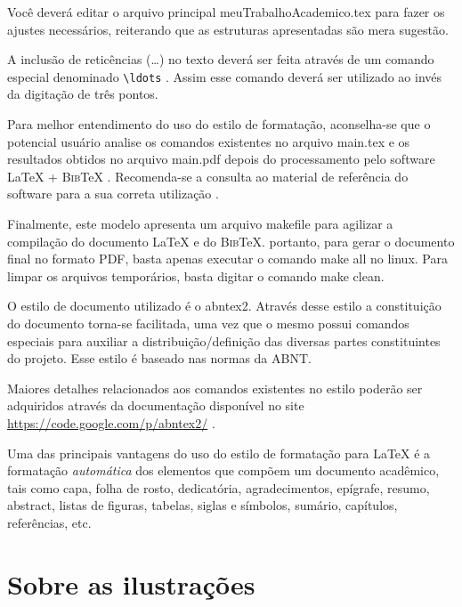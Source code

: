 \begin{apendicesenv}
Você deverá editar o arquivo principal {\ttfamily meuTrabalhoAcademico.tex} para
fazer os ajustes necessários, reiterando que as estruturas apresentadas são mera
sugestão.

A inclusão de reticências (\ldots) no texto deverá ser feita através de um
comando especial denominado \verb|\ldots| \cite{LaTeX2014}. Assim esse comando
deverá ser utilizado ao invés da digitação de três pontos.

Para melhor entendimento do uso do estilo de formatação, aconselha-se que o
potencial usuário analise os comandos existentes no arquivo {\ttfamily main.tex}
e os resultados obtidos no arquivo {\ttfamily main.pdf} depois do processamento
pelo software \LaTeX{} + \textsc{Bib}\TeX{} \cite{LaTeX2014,BibTeX2014}.
Recomenda-se a consulta ao material de referência do software para a sua correta
utilização \cite{Lamport1986,Buerger1989,Kopka2003,Mittelbach2004}.

Finalmente, este modelo apresenta um arquivo {\ttfamily makefile} para agilizar
a compilação do documento \LaTeX{} e do \textsc{Bib}\TeX{}. portanto, para gerar
o documento final no formato PDF, basta apenas executar o comando {\ttfamily
make all} no linux. Para limpar os arquivos temporários, basta digitar o comando
{\ttfamily make clean}.

O estilo de documento utilizado é o {\ttfamily abntex2}. Através desse estilo a
constituição do documento torna-se facilitada, uma vez que o mesmo possui
comandos especiais para auxiliar a distribuição/definição das diversas partes
constituintes do projeto. Esse estilo é baseado nas normas da ABNT.

Maiores detalhes relacionados aos comandos existentes no estilo poderão ser
adquiridos através da documentação disponível no site
\href{https://code.google.com/p/abntex2/}{https://code.google.com/p/abntex2/}
\cite{abnTeX22014b}.

Uma das principais vantagens do uso do estilo de formatação para \LaTeX{} é a
formatação \textit{automática} dos elementos que compõem um documento acadêmico,
tais como capa, folha de rosto, dedicatória, agradecimentos, epígrafe, resumo,
abstract, listas de figuras, tabelas, siglas e símbolos, sumário, capítulos,
referências, etc.


\chapter{Sobre as ilustrações}
\label{chap:apSobreIlust}


\end{apendicesenv}
